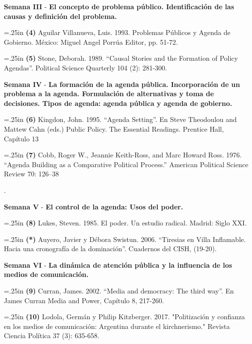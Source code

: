 \documentclass[11pt]{article}
\begin{document}
\vspace{.5cm}
\textbf{Semana III} - \textbf{El concepto de problema público. Identificación de las causas y definición del problema.}
\begin{onehalfspacing}

\hangindent=.25in \noindent\textbf{(4)} Aguilar Villanueva, Luis. 1993. Problemas Públicos y Agenda de Gobierno. México: Miguel Angel Porrúa Editor, pp. 51-72.

\hangindent=.25in \noindent \textbf{(5)} Stone, Deborah. 1989. “Causal Stories and the Formation of Policy Agendas”. Political Science Quarterly 104 (2): 281-300.
\end{onehalfspacing}

\vspace{.5cm}
\textbf{Semana IV} - \textbf{La formación de la agenda pública. Incorporación de un problema a la agenda. Formulación de alternativas y toma de decisiones. Tipos de agenda: agenda pública y agenda de gobierno.}

\begin{onehalfspacing}
\hangindent=.25in \noindent \textbf{(6)} Kingdon, John. 1995. “Agenda Setting”. En Steve Theodoulou and Mattew Cahn (eds.) Public Policy. The Essential Readings. Prentice Hall, Capítulo 13

\hangindent=.25in \noindent \textbf{(7)} Cobb, Roger W., Jeannie Keith-Ross, and Marc Howard Ross. 1976. “Agenda Building as a Comparative Political Process.” American Political Science Review 70: 126–38
\end{onehalfspacing}.
\vspace{.5cm}

\textbf{Semana V} - \textbf{El control de la agenda: Usos del poder.}

\begin{onehalfspacing}

\hangindent=.25in \noindent \textbf{(8)} Lukes, Steven. 1985. El poder. Un estudio radical. Madrid: Siglo XXI.

\hangindent=.25in \noindent \textbf{\textbf{(*)}} Auyero, Javier y Débora Swistun. 2006. “Tiresias en Villa Inflamable. Hacia una cronografía de la dominación”. Cuadernos del CISH, (19-20).
\end{onehalfspacing}

\vspace{.5cm}
\textbf{Semana VI} - \textbf{La dinámica de atención pública y la influencia de los medios de comunicación.}

\begin{onehalfspacing}
\hangindent=.25in \noindent \textbf{\textbf{(9)}} Curran, James. 2002. “Media and democracy: The third way”. En James Curran Media and Power, Capítulo 8, 217-260.

\hangindent=.25in \noindent \textbf{\textbf{(10)}} Lodola, Germán y Philip Kitzberger. 2017. "Politización y confianza en los medios de comunicación: Argentina durante el kirchnerismo." Revista Ciencia Política 37 (3): 635-658.
\end{onehalfspacing}
\end{document}
